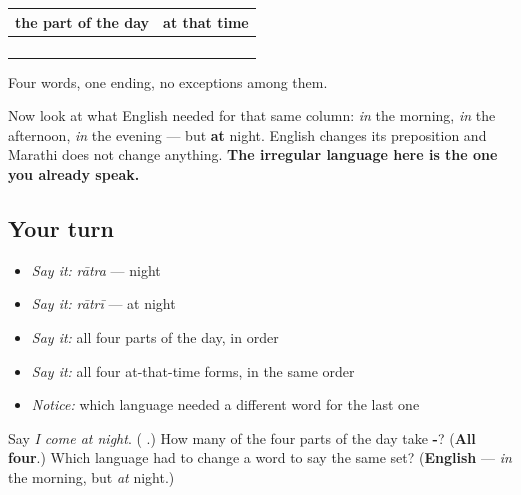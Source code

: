 \begin{grammarlens}[title={Grammar Lens: four for four, and what English does instead}]
\noindent
\begin{tabularx}{\linewidth}{@{}>{\raggedright\arraybackslash}X>{\raggedright\arraybackslash}X@{}}
\toprule
\textbf{the part of the day} & \textbf{at that time} \\
\midrule
\textbf{\mr{सकाळ}} & \textbf{\mr{सकाळी}} \\
\textbf{\mr{दुपार}} & \textbf{\mr{दुपारी}} \\
\textbf{\mr{संध्याकाळ}} & \textbf{\mr{संध्याकाळी}} \\
\textbf{\mr{रात्र}} & \textbf{\mr{रात्री}} \\
\bottomrule
\end{tabularx}

Four words, one ending, no exceptions among them.

Now look at what English needed for that same column: \emph{in} the morning, \emph{in} the afternoon, \emph{in} the evening — but \textbf{at} night. English changes its preposition and Marathi does not change anything. \textbf{The irregular language here is the one you already speak.}
\end{grammarlens}

\subsection*{Your turn}
\begin{itemize}
\raggedright
  \item \emph{Say it:} \emph{rātra} — night
  \item \emph{Say it:} \emph{rātrī} — at night
  \item \emph{Say it:} all four parts of the day, in order
  \item \emph{Say it:} all four at-that-time forms, in the same order
  \item \emph{Notice:} which language needed a different word for the last one
\end{itemize}

\begin{tcolorbox}[breakable,colback=teal!4,colframe=teal!35!black,title={Before you move on}]
Say \emph{I come at night}. (\emph{\textbf{  }}.) How many of the four parts of the day take \textbf{-}? (\textbf{All four}.) Which language had to change a word to say the same set? (\textbf{English} — \emph{in} the morning, but \emph{at} night.)
\end{tcolorbox}
